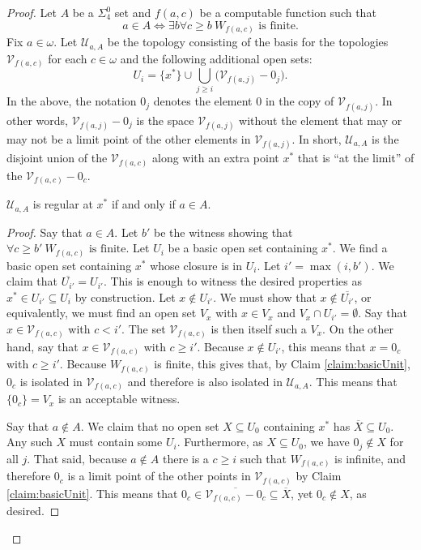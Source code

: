 \documentclass[11pt]{amsart}
\theoremstyle{remark}
\begin{document}
\begin{proof}
    Let $A$ be a $\Sigma^0_4$ set and $f(a,c)$ be a computable function such that
    \[a\in A\iff \exists b\forall c\geq b ~ W_{f(a,c)} \text{ is finite.}\]
    Fix $a \in \omega$. Let $\mathcal{U}_{a,A}$ be the topology consisting of the basis for the topologies $\mathcal{V}_{f(a,c)}$ for each $c\in\omega$ and the following additional open sets:
    \[U_i=\{x^*\}\cup \bigcup_{j\geq i}\big(\mathcal{V}_{f(a,j)}-0_{j}\big).\]
    In the above, the notation $0_j$ denotes the element $0$ in the copy of $\mathcal{V}_{f(a,j)}$.
    In other words, $\mathcal{V}_{f(a,j)}-0_j$ is the space $\mathcal{V}_{f(a,j)}$ without the element that may or may not be a limit point of the other elements in $\mathcal{V}_{f(a,j)}$.
    In short, $\mathcal{U}_{a,A}$ is the disjoint union of the $\mathcal{V}_{f(a,c)}$ along with an extra point $x^*$ that is ``at the limit'' of the $\mathcal{V}_{f(a,c)}-0_c$.

    \begin{claim}\label{claim:biggerUnit}
    $\mathcal{U}_{a,A}$ is regular at $x^*$ if and only if $a\in A$.

    \end{claim}

    \begin{proof}
    Say that $a\in A$.
    Let $b'$ be the witness showing that $\forall c\geq b'~W_{f(a,c)} \text{ is finite.}$
    Let $U_i$ be a basic open set containing $x^*$.
    We find a basic open set containing $x^*$ whose closure is in $U_i$.
    Let $i'=\max(i,b')$.
    We claim that $\overline{U_{i'}}=U_{i'}$.
    This is enough to witness the desired properties as $x^*\in U_{i'}\subseteq U_i$ by construction.
    Let $x\not\in U_{i'}$. We must show that $x\not\in\overline{U_{i'}}$, or equivalently, we must find an open set $V_x$ with $x\in V_x$ and $V_x\cap U_{i'}=\emptyset$.
    Say that $x\in \mathcal{V}_{f(a,c)}$ with $c<i'$.
    The set $\mathcal{V}_{f(a,c)}$ is then itself such a $V_x$.
    On the other hand, say that $x\in \mathcal{V}_{f(a,c)}$ with $c\geq i'$.
    Because $x\not\in U_{i'}$, this means that $x=0_c$ with $c\geq i'$.
    Because $W_{f(a,c)}$ is finite, this gives that, by Claim \ref{claim:basicUnit}, $0_c$ is isolated in $\mathcal{V}_{f(a,c)}$ and therefore is also isolated in $\mathcal{U}_{a,A}$.
    This means that $\{0_c\}=V_x$ is an acceptable witness.

    Say that $a\not\in A$.
    We claim that no open set $X\subseteq U_0$ containing $x^*$ has $\overline{X}\subseteq U_0$.
    Any such $X$ must contain some $U_i$.
    Furthermore, as $X\subseteq U_0$, we have $0_j \notin X$ for all $j$.
    That said, because $a\not\in A$ there is a $c\geq i$ such that $W_{f(a,c)}$ is infinite, and therefore $0_c$ is a limit point of the other points in $\mathcal{V}_{f(a,c)}$ by Claim \ref{claim:basicUnit}.
    This means that $0_c\in \overline{\mathcal{V}_{f(a,c)}-0_c} \subseteq \overline{X}$, yet $0_c\not\in X$, as desired.
    \end{proof}


\end{proof}
\end{document}
